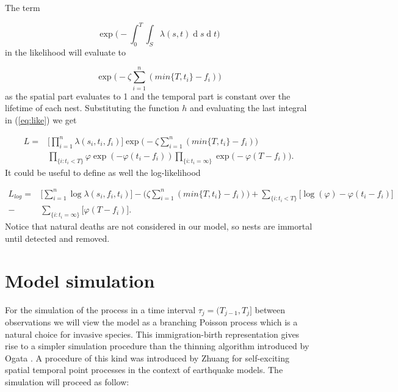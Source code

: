 \documentclass[11pt,a4paper]{article}
\renewcommand{\d}[1]{\ensuremath{\operatorname{d}\!{#1}}}
\begin{document}
The term 

\begin{equation*}
    \exp \bigg(- \int_{0}^{T} \int_{S} \lambda(s, t)\d s \d t \bigg)
\end{equation*}
in the likelihood will evaluate to 

\begin{equation*}
    \exp \bigg(- \zeta \sum_{i=1}^{n} (min\{ T, t_i \} - f_i) \bigg)
\end{equation*}
as the spatial part evaluates to 1 and the temporal part is constant over the lifetime of each nest. Substituting the function $h$ and evaluating the last integral in (\ref{eq:like}) we get

\begin{equation*}
    \begin{aligned}
        L = & \Bigg[ \prod_{i = 1}^{n} \lambda(s_{i}, t_{i}, f_{i}) \Bigg] \exp \bigg(- \zeta \sum_{i=1}^{n} (min\{ T, t_i \} - f_i) \bigg) \\ 
        & \prod_{\{ i : t_{i} < T \} } \varphi \exp (- \varphi (t_{i} - f_{i})) \prod_{ \{ i : t_{i} = \infty \} } \exp \bigg( - \varphi(T - f_{i}) \bigg).
    \end{aligned}
\end{equation*}
It could be useful to define as well the log-likelihood

\begin{equation*}
    \begin{aligned}
        L_{log} = & \Bigg[ \sum_{i = 1}^{n} \log \lambda(s_{i},f_{i}, t_{i}) \Bigg] - \bigg(\zeta \sum_{i=1}^{n} (min\{ T, t_i \} - f_i) \bigg)  + \sum_{\{ i : t_{i} < T \} }  \bigg[\log (\varphi) -\varphi(t_{i} - f_{i}) \bigg] \\
        - & \sum_{ \{ i : t_{i} = \infty \} } \bigg[\varphi(T - f_{i}) \bigg].
    \end{aligned}
\end{equation*}
Notice that natural deaths are not considered in our model, so nests are immortal until detected and removed.

\section{Model simulation} \label{section:simulationModel}

For the simulation of the process in a time interval $\tau_j = (T_{j-1}, T_j]$ between observations we will view the model as a branching Poisson process \cite{Lewis} which is a natural choice for invasive species. This immigration-birth representation gives rise to a simpler simulation procedure than the thinning algorithm introduced by Ogata \cite{Ogata}. A procedure of this kind was introduced by Zhuang \cite{Zhuang} for self-exciting spatial temporal point processes in the context of earthquake models. The simulation will proceed as follow:
\end{document}
